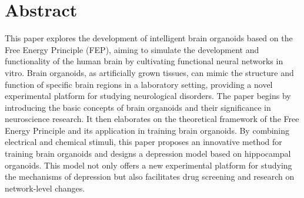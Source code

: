 
\chapter*{Abstract}%

This paper explores the development of intelligent brain organoids based on the Free Energy Principle (FEP), aiming to simulate the development and functionality of the human brain by cultivating functional neural networks in vitro. Brain organoids, as artificially grown tissues, can mimic the structure and function of specific brain regions in a laboratory setting, providing a novel experimental platform for studying neurological disorders. The paper begins by introducing the basic concepts of brain organoids and their significance in neuroscience research. It then elaborates on the theoretical framework of the Free Energy Principle and its application in training brain organoids. By combining electrical and chemical stimuli, this paper proposes an innovative method for training brain organoids and designs a depression model based on hippocampal organoids. This model not only offers a new experimental platform for studying the mechanisms of depression but also facilitates drug screening and research on network-level changes.

